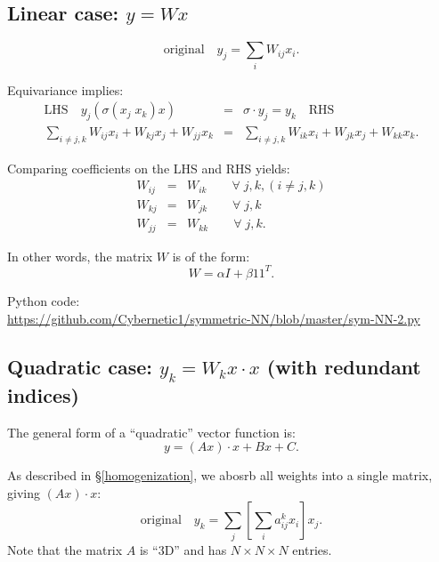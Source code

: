 \subsection{Linear case: $y = W x$}

\begin{equation}
\boxed{\mbox{original}} \quad y_j = \sum_i W_{ij} x_i .
\end{equation}

Equivariance implies:
\begin{eqnarray}
\boxed{\mbox{LHS}} \quad y_j ( \sigma(x_j \; x_k) x) &=& \sigma \cdot y_j = y_k \quad \boxed{\mbox{RHS}} \\
\sum_{i \neq j,k} W_{ij} x_i + W_{kj} x_j + W_{jj} x_k &=& \sum_{i \neq j,k} W_{ik} x_i + W_{jk} x_j + W_{kk} x_k . \nonumber
\end{eqnarray}


Comparing coefficients on the LHS and RHS yields:
\begin{eqnarray}
W_{ij} &=& W_{ik} \quad \quad \forall \; j, k, (i \neq j, k) \nonumber \\
W_{kj} &=& W_{jk} \quad \quad \forall \; j, k \nonumber \\
W_{jj} &=& W_{kk} \quad \quad \forall \; j, k .
\end{eqnarray}

In other words, the matrix $W$ is of the form:
\begin{equation}
W = \alpha I + \beta 1 1^T .
\end{equation}

Python code: \\
\href{https://github.com/Cybernetic1/symmetric-NN/blob/master/sym-NN-2.py}{https://github.com/Cybernetic1/symmetric-NN/blob/master/sym-NN-2.py}

\subsection{Quadratic case: $y_k = W_k x \cdot x$ (with redundant indices)}

The general form of a ``quadratic'' vector function is:
\begin{equation}
y = (A x) \cdot x + B x + C .
\end{equation}

As described in \S\ref{homogenization}, we abosrb all weights into a single matrix, giving $(A x) \cdot x$:
\begin{equation}
\boxed{\mbox{original}} \quad y_k = \sum_j \left[ \sum_i a_{ij}^k x_i \right] x_j .
\end{equation}
Note that the matrix $A$ is ``3D'' and has $N \times N \times N$ entries.

